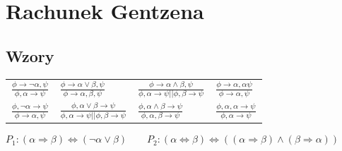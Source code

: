 \section{Rachunek Gentzena}

\subsection{Wzory}

\begin{tabularx}{\textwidth}{X X X X}
    \centering
    $ \displaystyle\frac{\phi \rightarrow \neg \alpha ,\psi }{\phi, \alpha \rightarrow \psi} $ & 
    $ \displaystyle\frac{\phi \rightarrow \alpha \lor \beta, \psi }{\phi \rightarrow \alpha, \beta, \psi} $ &
    $ \displaystyle\frac{\phi \rightarrow \alpha \land \beta, \psi }{\phi, \alpha \rightarrow \psi || \phi, \beta \rightarrow \psi} $ &
    $ \displaystyle\frac{\phi \rightarrow \alpha, \alpha \psi}{\phi \rightarrow \alpha, \psi} $ \\[20pt]

    \centering
    $ \displaystyle\frac{\phi, \neg \alpha \rightarrow \psi}{\phi \rightarrow \alpha, \psi} $ &
    $ \displaystyle\frac{\phi, \alpha \lor \beta \rightarrow \psi}{\phi, \alpha \rightarrow \psi || \phi, \beta \rightarrow \psi} $ &
    $ \displaystyle\frac{\phi, \alpha \land \beta \rightarrow \psi}{\phi, \alpha, \beta \rightarrow \psi} $ & 
    $ \displaystyle\frac{\phi, \alpha, \alpha \rightarrow \psi}{\phi, \alpha \rightarrow \psi} $ \\[20pt]
\end{tabularx}

$ P_1 : (\alpha \Rightarrow \beta) \Leftrightarrow (\neg \alpha \lor \beta) \quad \quad 
P_2 : (\alpha \Leftrightarrow \beta) \Leftrightarrow ((\alpha \Rightarrow \beta) \land (\beta \Rightarrow \alpha)) $